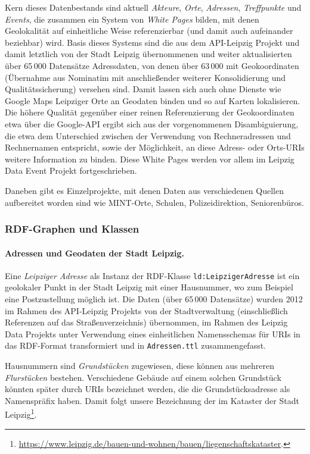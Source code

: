 \documentclass[a4paper,11pt]{article}
\begin{document}
Kern dieses Datenbestands sind aktuell \emph{Akteure}, \emph{Orte},
\emph{Adressen}, \emph{Treffpunkte} und \emph{Events}, die zusammen ein System
von \emph{White Pages} bilden, mit denen Geolokalität auf einheitliche Weise
referenzierbar (und damit auch aufeinander beziehbar) wird. Basis dieses
Systems sind die aus dem API-Leipzig Projekt und damit letztlich von der Stadt
Leipzig übernommenen und weiter aktualisierten über 65\,000 Datensätze
Adressdaten, von denen über 63\,000 mit Geokoordinaten (Übernahme aus
Nominatim mit anschließender weiterer Konsolidierung und Qualitätssicherung)
versehen sind. Damit lassen sich auch ohne Dienste wie Google Maps Leipziger
Orte an Geodaten binden und so auf Karten lokalisieren. Die höhere Qualität
gegenüber einer reinen Referenzierung der Geokoordinaten etwa über die
Google-API ergibt sich aus der vorgenommenen Disambiguierung, die etwa dem
Unterschied zwischen der Verwendung von Rechneradressen und Rechnernamen
entspricht, sowie der Möglichkeit, an diese Adress- oder Orts-URIs weitere
Information zu binden. Diese White Pages werden vor allem im Leipzig Data
Event Projekt fortgeschrieben.

Daneben gibt es Einzelprojekte, mit denen Daten aus verschiedenen Quellen
aufbereitet worden sind wie MINT-Orte, Schulen, Polizeidirektion,
Seniorenbüros.

\subsubsection*{RDF-Graphen und Klassen}

\paragraph{Adressen und Geodaten der Stadt Leipzig.} 
Eine \emph{Leipziger Adresse} als Instanz der RDF-Klasse
\texttt{ld:LeipzigerAdresse} ist ein geolokaler Punkt in der Stadt Leipzig mit
einer Hausnummer, wo zum Beispiel eine Postzustellung möglich ist. Die Daten
(über 65\,000 Datensätze) wurden 2012 im Rahmen des API-Leipzig Projekts von
der Stadtverwaltung (einschließlich Referenzen auf das Straßenverzeichnis)
übernommen, im Rahmen des Leipzig Data Projekts unter Verwendung eines
einheitlichen Namensschemas für URIs in das RDF-Format transformiert und in
\texttt{Adressen.ttl} zusammengefasst.

Hausnummern sind \emph{Grundstücken} zugewiesen, diese können aus mehreren
\emph{Flurstücken} bestehen. Verschiedene Gebäude auf einem solchen Grundstück
könnten später durch URIs bezeichnet werden, die die Grundstücksadresse als
Namenspräfix haben. Damit folgt unsere Bezeichnung der im Kataster der Stadt
Leipzig\footnote{\url{https://www.leipzig.de/bauen-und-wohnen/bauen/liegenschaftskataster}.}.
\end{document}
